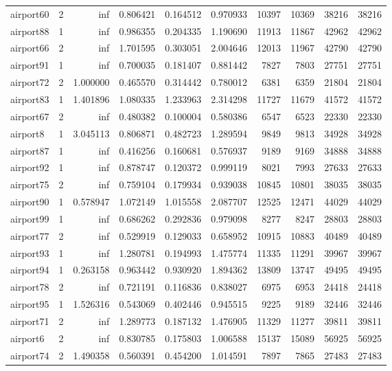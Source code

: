\begin{longtable}{|l|r|r|r|r|r|r|r|r|r|}
airport60 & 2 & inf & 0.806421 & 0.164512 & 0.970933 & 10397 & 10369 & 38216 & 38216 \\
airport88 & 1 & inf & 0.986355 & 0.204335 & 1.190690 & 11913 & 11867 & 42962 & 42962 \\
airport66 & 2 & inf & 1.701595 & 0.303051 & 2.004646 & 12013 & 11967 & 42790 & 42790 \\
airport91 & 1 & inf & 0.700035 & 0.181407 & 0.881442 & 7827 & 7803 & 27751 & 27751 \\
airport72 & 2 & 1.000000 & 0.465570 & 0.314442 & 0.780012 & 6381 & 6359 & 21804 & 21804 \\
airport83 & 1 & 1.401896 & 1.080335 & 1.233963 & 2.314298 & 11727 & 11679 & 41572 & 41572 \\
airport67 & 2 & inf & 0.480382 & 0.100004 & 0.580386 & 6547 & 6523 & 22330 & 22330 \\
airport8 & 1 & 3.045113 & 0.806871 & 0.482723 & 1.289594 & 9849 & 9813 & 34928 & 34928 \\
airport87 & 1 & inf & 0.416256 & 0.160681 & 0.576937 & 9189 & 9169 & 34888 & 34888 \\
airport92 & 1 & inf & 0.878747 & 0.120372 & 0.999119 & 8021 & 7993 & 27633 & 27633 \\
airport75 & 2 & inf & 0.759104 & 0.179934 & 0.939038 & 10845 & 10801 & 38035 & 38035 \\
airport90 & 1 & 0.578947 & 1.072149 & 1.015558 & 2.087707 & 12525 & 12471 & 44029 & 44029 \\
airport99 & 1 & inf & 0.686262 & 0.292836 & 0.979098 & 8277 & 8247 & 28803 & 28803 \\
airport77 & 2 & inf & 0.529919 & 0.129033 & 0.658952 & 10915 & 10883 & 40489 & 40489 \\
airport93 & 1 & inf & 1.280781 & 0.194993 & 1.475774 & 11335 & 11291 & 39967 & 39967 \\
airport94 & 1 & 0.263158 & 0.963442 & 0.930920 & 1.894362 & 13809 & 13747 & 49495 & 49495 \\
airport78 & 2 & inf & 0.721191 & 0.116836 & 0.838027 & 6975 & 6953 & 24418 & 24418 \\
airport95 & 1 & 1.526316 & 0.543069 & 0.402446 & 0.945515 & 9225 & 9189 & 32446 & 32446 \\
airport71 & 2 & inf & 1.289773 & 0.187132 & 1.476905 & 11329 & 11277 & 39811 & 39811 \\
airport6 & 2 & inf & 0.830785 & 0.175803 & 1.006588 & 15137 & 15089 & 56925 & 56925 \\
airport74 & 2 & 1.490358 & 0.560391 & 0.454200 & 1.014591 & 7897 & 7865 & 27483 & 27483 \\

\end{longtable}
